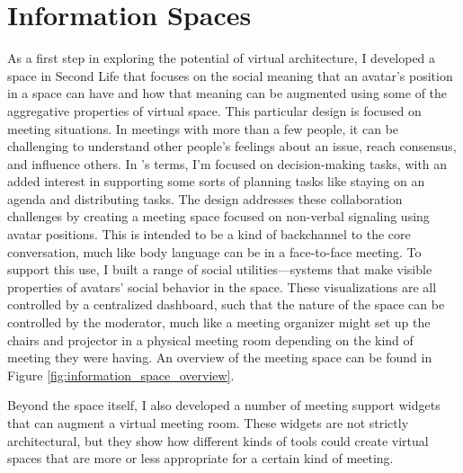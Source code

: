 \section{Information Spaces}
As a first step in exploring the potential of virtual architecture, I developed a space in Second Life that focuses on the social meaning that an avatar's position in a space can have and how that meaning can be augmented using some of the aggregative properties of virtual space. \citep{Harry:2008ww} This particular design is focused on meeting situations. In meetings with more than a few people, it can be challenging to understand other people's feelings about an issue, reach consensus, and influence others. In \citet{McGrath:1984un}'s terms, I'm focused on decision-making tasks, with an added interest in supporting some sorts of planning tasks like staying on an agenda and distributing tasks. The design addresses these collaboration challenges by creating a meeting space focused on non-verbal signaling using avatar positions. This is intended to be a kind of backchannel to the core conversation, much like body language can be in a face-to-face meeting. To support this use, I built a range of social utilities---systems that make visible properties of avatars' social behavior in the space. These visualizations are all controlled by a centralized dashboard, such that the nature of the space can be controlled by the moderator, much like a meeting organizer might set up the chairs and projector in a physical meeting room depending on the kind of meeting they were having. An overview of the meeting space can be found in  Figure \ref{fig:information_space_overview}.

Beyond the space itself, I also developed a number of meeting support widgets that can augment a virtual meeting room. These widgets are not strictly architectural, but they show how different kinds of tools could create virtual spaces that are more or less appropriate for a certain kind of meeting.

